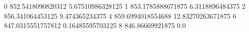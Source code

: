0 852.5418090820312 5.67510986328125
1 853.1785888671875 6.3118896484375
2 856.341064453125 9.474365234375
4 859.6994018554688 12.83270263671875
6 847.0315551757812 0.16485595703125
8 846.86669921875 0.0

